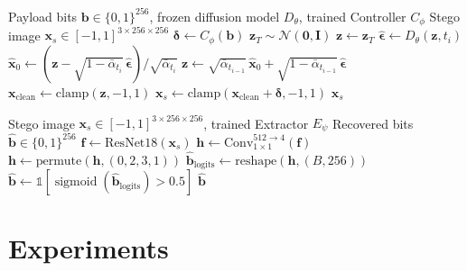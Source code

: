 \documentclass[10pt, twocolumn]{article}
\newcommand{\Ncal}{\mathcal{N}}
\DeclareMathOperator{\sigmoid}{sigmoid}
\begin{document}
\begin{algorithm}[t]
\caption{DSCSP Encoding}
\label{alg:encoding}
\begin{algorithmic}[1]
\REQUIRE Payload bits $\mathbf{b} \in \{0,1\}^{256}$, frozen diffusion model $D_\theta$, trained Controller $C_\phi$
\ENSURE Stego image $\mathbf{x}_s \in [-1, 1]^{3 \times 256 \times 256}$
\STATE $\bm{\delta} \leftarrow C_\phi(\mathbf{b})$ 
\STATE $\mathbf{z}_T \sim \Ncal(\mathbf{0}, \mathbf{I})$ 
\STATE $\mathbf{z} \leftarrow \mathbf{z}_T$
    \STATE $\hat{\bm{\epsilon}} \leftarrow D_\theta(\mathbf{z}, t_i)$ 
    \STATE $\hat{\mathbf{x}}_0 \leftarrow (\mathbf{z} - \sqrt{1 - \bar{\alpha}_{t_i}}\, \hat{\bm{\epsilon}}) / \sqrt{\bar{\alpha}_{t_i}}$
    \STATE $\mathbf{z} \leftarrow \sqrt{\bar{\alpha}_{t_{i-1}}}\, \hat{\mathbf{x}}_0 + \sqrt{1 - \bar{\alpha}_{t_{i-1}}}\, \hat{\bm{\epsilon}}$
\ENDFOR
\STATE $\mathbf{x}_\text{clean} \leftarrow \text{clamp}(\mathbf{z}, -1, 1)$
\STATE $\mathbf{x}_s \leftarrow \text{clamp}(\mathbf{x}_\text{clean} + \bm{\delta}, -1, 1)$
\RETURN $\mathbf{x}_s$
\end{algorithmic}
\end{algorithm}

\begin{algorithm}[t]
\caption{DSCSP Extraction}
\label{alg:extraction}
\begin{algorithmic}[1]
\REQUIRE Stego image $\mathbf{x}_s \in [-1, 1]^{3 \times 256 \times 256}$, trained Extractor $E_\psi$
\ENSURE Recovered bits $\hat{\mathbf{b}} \in \{0,1\}^{256}$
\STATE $\mathbf{f} \leftarrow \text{ResNet18}(\mathbf{x}_s)$ 
\STATE $\mathbf{h} \leftarrow \text{Conv}_{1\times1}^{512 \to 4}(\mathbf{f})$ 
\STATE $\mathbf{h} \leftarrow \text{permute}(\mathbf{h}, (0,2,3,1))$ 
\STATE $\hat{\mathbf{b}}_\text{logits} \leftarrow \text{reshape}(\mathbf{h}, (B, 256))$
\STATE $\hat{\mathbf{b}} \leftarrow \mathbb{1}[\sigmoid(\hat{\mathbf{b}}_\text{logits}) > 0.5]$ 
\RETURN $\hat{\mathbf{b}}$
\end{algorithmic}
\end{algorithm}


\section{Experiments}
\label{sec:experiments}
\end{document}
